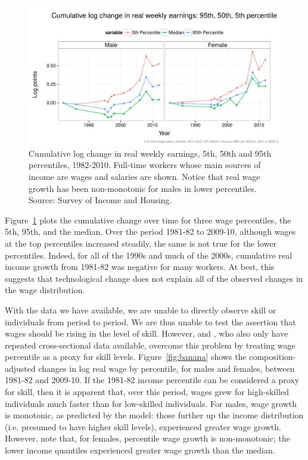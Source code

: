 \begin{figure}
  \centering
  \includegraphics[width=\textwidth]{../figure/wage_change_time.pdf}
  \caption{Cumulative log change in real weekly earnings, 5th, 50th and 95th percentiles, 1982-2010. Full-time workers whose main sources of income are wages and salaries are shown. Notice that real wage growth has been non-monotonic for males in lower percentiles. Source: Survey of Income and Housing.}
  \label{fig:changetime}
\end{figure}

Figure~\ref{fig:changetime} plots the cumulative change over time for three wage percentiles, the 5th, 95th, and the median. Over the period 1981-82 to 2009-10, although wages at the top percentiles increased steadily, the same is not true for the lower percentiles. Indeed, for all of the 1990s and much of the 2000s, cumulative real income growth from 1981-82 was negative for many workers. At best, this suggests that technological change does not explain all of the observed changes in the wage distribution.

With the data we have available, we are unable to directly observe skill or individuals from period to period. We are thus unable to test the assertion that wages should be rising in the level of skill. However, \citet{Goos2007} and \citet{Acemoglu2011}, who also only have repeated cross-sectional data available, overcome this problem by treating wage percentile as a proxy for skill levels.  Figure~\ref{fig:banana} shows the composition-adjusted changes in log real wage by percentile, for males and females, between 1981-82 and 2009-10. If the 1981-82 income percentile can be considered a proxy for skill, then it is apparent that, over this period, wages grew for high-skilled individuals much faster than for low-skilled individuals. For males, wage growth is monotonic, as predicted by the model: those further up the income distribution (i.e. presumed to have higher skill levels), experienced greater wage growth. However, note that, for females, percentile wage growth is non-monotonic; the lower income quantiles experienced greater wage growth than the median.

